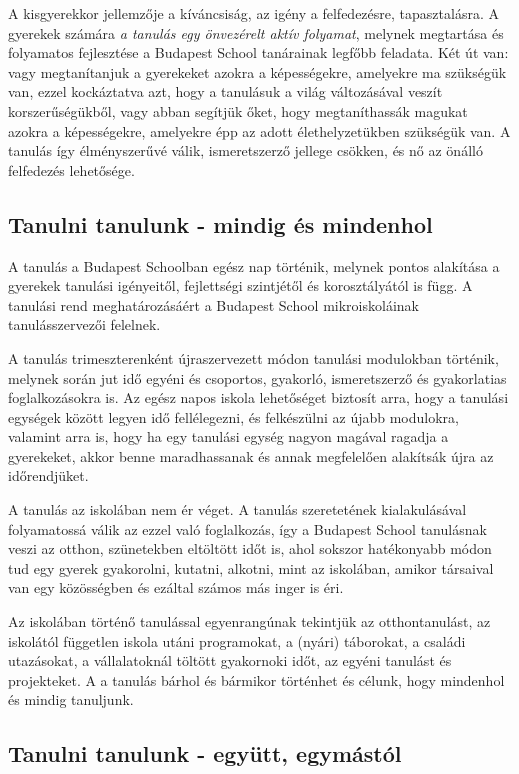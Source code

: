 A kisgyerekkor jellemzője a kíváncsiság, az igény a felfedezésre, tapasztalásra. A gyerekek számára  \emph{a tanulás  egy önvezérelt aktív folyamat}, melynek megtartása és folyamatos fejlesztése a Budapest School tanárainak legfőbb feladata. Két út van: vagy megtanítanjuk a gyerekeket azokra a képességekre, amelyekre ma szükségük van, ezzel kockáztatva azt, hogy a tanulásuk a világ változásával veszít korszerűségükből, vagy abban segítjük őket, hogy megtaníthassák magukat azokra a képességekre, amelyekre épp az adott élethelyzetükben szükségük van. A tanulás így élményszerűvé válik, ismeretszerző jellege csökken, és nő az önálló felfedezés lehetősége.

\subsection{Tanulni tanulunk - mindig és mindenhol}
A tanulás a Budapest Schoolban egész nap történik, melynek pontos alakítása a gyerekek tanulási igényeitől, fejlettségi szintjétől és korosztályától is függ. A tanulási rend meghatározásáért a Budapest School mikroiskoláinak tanulásszervezői felelnek.

A tanulás trimeszterenként újraszervezett módon tanulási modulokban történik, melynek során jut idő egyéni és csoportos, gyakorló, ismeretszerző és gyakorlatias foglalkozásokra is. Az egész napos iskola lehetőséget biztosít arra, hogy a tanulási egységek között legyen idő fellélegezni, és felkészülni az újabb modulokra, valamint arra is, hogy ha egy tanulási egység nagyon magával ragadja a gyerekeket, akkor benne maradhassanak és annak megfelelően alakítsák újra az időrendjüket.

A tanulás az iskolában nem ér véget. A tanulás szeretetének kialakulásával folyamatossá válik az ezzel való foglalkozás, így a Budapest School tanulásnak veszi az otthon, szünetekben eltöltött időt is, ahol sokszor hatékonyabb módon tud egy gyerek gyakorolni, kutatni, alkotni, mint az iskolában, amikor társaival van egy közösségben és ezáltal számos más inger is éri.

Az iskolában történő tanulással egyenrangúnak tekintjük az otthontanulást, az iskolától független iskola utáni programokat, a (nyári) táborokat, a családi utazásokat, a vállalatoknál töltött gyakornoki időt, az egyéni tanulást és projekteket. A a tanulás bárhol és bármikor történhet és célunk, hogy mindenhol és mindig tanuljunk.

\subsection{Tanulni tanulunk - együtt, egymástól}

